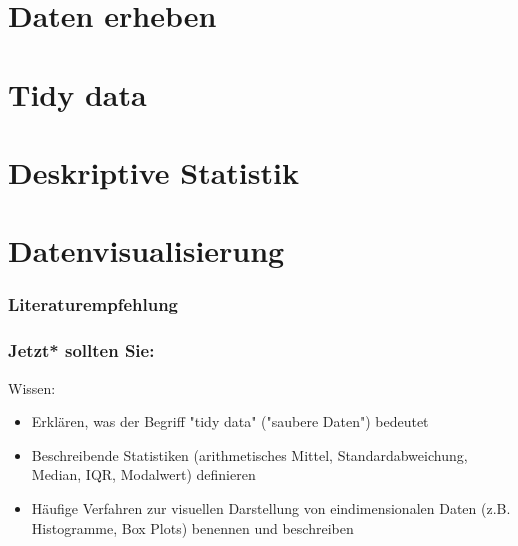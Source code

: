 \documentclass{beamer}
\begin{document}

\section{Daten erheben}




\section{Tidy data}


\section{Deskriptive Statistik}


\section{Datenvisualisierung}



\begin{frame}
\frametitle{Literaturempfehlung}

\begin{itemize}
\end{itemize}




\end{frame}




\begin{frame}

\frametitle{Jetzt* sollten Sie:}



\begin{block}{Wissen:}

\begin{itemize}
\item
Erklären, was der Begriff "tidy data" ("saubere Daten") bedeutet
\item 
Beschreibende Statistiken (arithmetisches Mittel, Standardabweichung, Median, IQR, Modalwert) definieren
\item 
Häufige Verfahren zur visuellen Darstellung von eindimensionalen Daten (z.B. Histogramme, Box Plots) benennen und beschreiben 
\end{itemize}

\end{block}

 


\end{frame}
\end{document}
